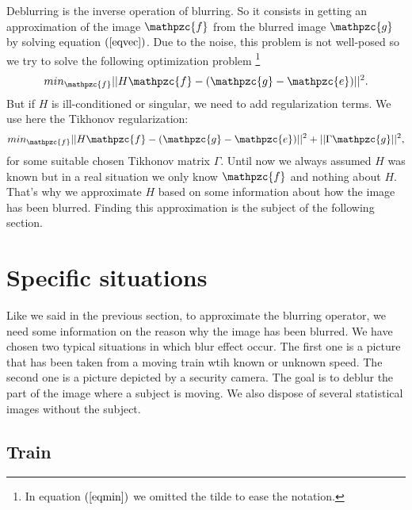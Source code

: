 Deblurring is the inverse operation of blurring. So it consists in getting an approximation of the image $\mathpzc{f}$ from the blurred image $\mathpzc{g}$ by solving equation $(\ref{eqvec})$. Due to the noise, this problem is not well-posed so we try to solve the following optimization problem \footnote{In equation $(\ref{eqmin})$ we omitted the tilde to ease the notation.}
\begin{equation}
min_{\mathpzc{f}} ||H\mathpzc{f}-(\mathpzc{g}-\mathpzc{e})||^2.
\label{eqmin}
\end{equation}
But if $H$ is ill-conditioned or singular, we need to add regularization terms. We use here the Tikhonov regularization:
\begin{equation}
min_{\mathpzc{f}} ||H\mathpzc{f}-(\mathpzc{g}-\mathpzc{e})||^2+||\Gamma \mathpzc{g}||^2,
\end{equation}
for some suitable chosen Tikhonov matrix $\Gamma$. Until now we always assumed $H$ was known but in a real situation we only know $\mathpzc{f}$ and nothing about $H$. That's why we approximate $H$ based on some information about how the image has been blurred. Finding this approximation is the subject of the following section.

\section{Specific situations}

Like we said in the previous section, to approximate the blurring operator, we need some information on the reason why the image has been blurred. We have chosen two typical situations in which blur effect occur. The first one is a picture that has been taken from a moving train wtih known or unknown speed. The second one is a picture depicted by a security camera. The goal is to deblur the part of the image where a subject is moving. We also dispose of several statistical images without the subject.

\subsection{Train}

